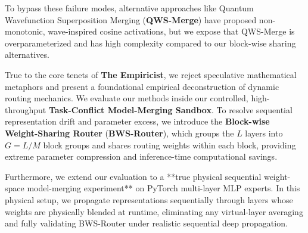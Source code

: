 To bypass these failure modes, alternative approaches like Quantum Wavefunction Superposition Merging (\textbf{QWS-Merge}) \cite{qws_merge_orig} have proposed non-monotonic, wave-inspired cosine activations, but we expose that QWS-Merge is overparameterized and has high complexity compared to our block-wise sharing alternatives.

True to the core tenets of \textbf{The Empiricist}, we reject speculative mathematical metaphors and present a foundational empirical deconstruction of dynamic routing mechanics. We evaluate our methods inside our controlled, high-throughput \textbf{Task-Conflict Model-Merging Sandbox}. To resolve sequential representation drift and parameter excess, we introduce the \textbf{Block-wise Weight-Sharing Router} (\textbf{BWS-Router}), which groups the $L$ layers into $G = L / M$ block groups and shares routing weights within each block, providing extreme parameter compression and inference-time computational savings.

Furthermore, we extend our evaluation to a **true physical sequential weight-space model-merging experiment** on PyTorch multi-layer MLP experts. In this physical setup, we propagate representations sequentially through layers whose weights are physically blended at runtime, eliminating any virtual-layer averaging and fully validating BWS-Router under realistic sequential deep propagation.

